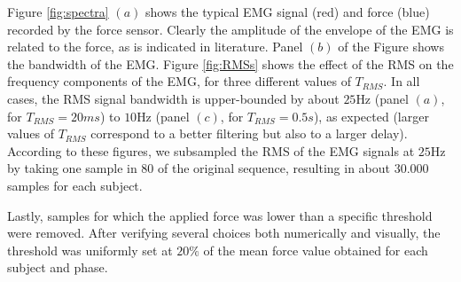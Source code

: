 \documentclass[10pt]{bmc_article}
\def\texttt{[image: ]}
\newenvironment{bmcformat}{\begin{raggedright}\baselineskip20pt\sloppy\setboolean{publ}{false}}{\end{raggedright}\baselineskip20pt\sloppy}
\begin{document}
\begin{bmcformat}


Figure \ref{fig:spectra} $(a)$ shows the typical EMG signal (red)
and force (blue) recorded by the force sensor. Clearly the
amplitude of the envelope of the EMG is related to the force, as is
indicated in literature. Panel $(b)$ of the Figure shows the bandwidth
of the EMG. Figure \ref{fig:RMSs} shows the effect of the RMS
on the frequency components of the EMG, for three different values of
$T_{RMS}$. In all cases, the RMS signal bandwidth is
upper-bounded by about $25$Hz (panel $(a)$, for $T_{RMS}=20ms$) to
$10$Hz (panel $(c)$, for $T_{RMS}=0.5s$), as expected (larger values
of $T_{RMS}$ correspond to a better filtering but also to a larger
delay). According to these figures, we subsampled the RMS of the EMG
signals at $25$Hz by taking one sample in $80$ of the original sequence,
resulting in about $30.000$ samples for each subject.

Lastly, samples for which the applied force was lower than a specific
threshold were removed. After verifying several choices both numerically
and visually, the threshold was uniformly set at $20\%$ of the mean force
value obtained for each subject and phase.


\end{bmcformat}
\end{document}

